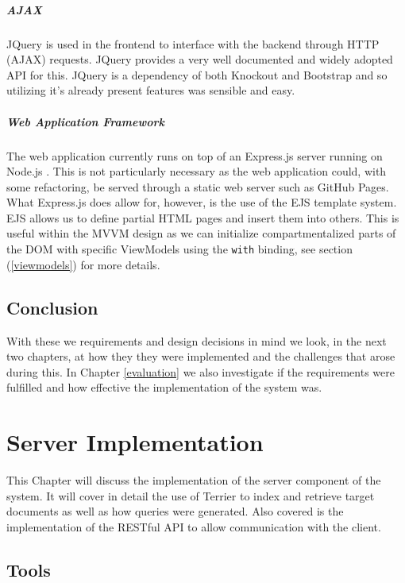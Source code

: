 \documentclass{l4proj}
\newcommand{\code}[1]{\texttt{#1}}
\begin{document}
\paragraph{AJAX}
JQuery is used in the frontend to interface with the backend through HTTP (AJAX) requests. JQuery provides a very well documented and widely adopted API for this. JQuery is a dependency of both Knockout and Bootstrap and so utilizing it's already present features was sensible and easy.

\paragraph{Web Application Framework}
The web application currently runs on top of an Express.js server running on Node.js \cite{express} \cite{node}. This is not particularly necessary as the web application could, with some refactoring, be served through a static web server such as GitHub Pages. What Express.js does allow for, however, is the use of the EJS template system. EJS allows us to define partial HTML pages and insert them into others. This is useful within the MVVM design as we can initialize compartmentalized parts of the DOM with specific ViewModels using the \code{with} binding, see section (\ref{viewmodels}) for more details.


\section{Conclusion}
With these we requirements and design decisions in mind we look, in the next two chapters, at how they they were implemented and the challenges that arose during this. In Chapter \ref{evaluation} we also investigate if the requirements were fulfilled and how effective the implementation of the system was.

\chapter{Server Implementation} \label{serverimplementation}
This Chapter will discuss the implementation of the server component of the system. It will cover in detail the use of Terrier to index and retrieve target documents as well as how queries were generated. Also covered is the implementation of the RESTful API to allow communication with the client.
\section{Tools}
\end{document}
